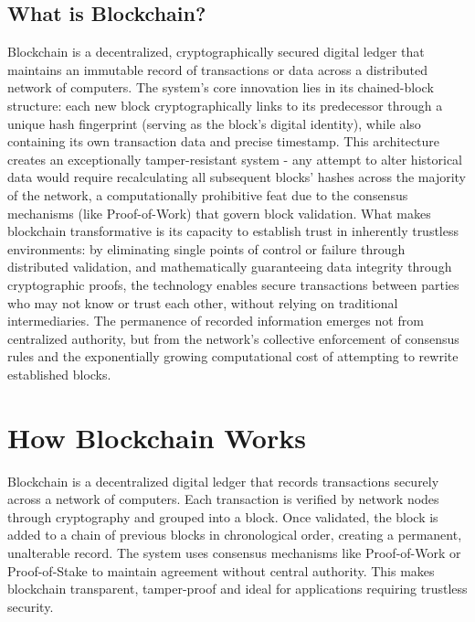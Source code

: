\documentclass[12pt, a4paper]{article}
\begin{document}
\subsection{What is Blockchain?}
Blockchain is a decentralized, cryptographically secured digital ledger that maintains an immutable record of transactions or data across a distributed network of computers. The system's core innovation lies in its chained-block structure: each new block cryptographically links to its predecessor through a unique hash fingerprint (serving as the block's digital identity), while also containing its own transaction data and precise timestamp. This architecture creates an exceptionally tamper-resistant system - any attempt to alter historical data would require recalculating all subsequent blocks' hashes across the majority of the network, a computationally prohibitive feat due to the consensus mechanisms (like Proof-of-Work) that govern block validation. What makes blockchain transformative is its capacity to establish trust in inherently trustless environments: by eliminating single points of control or failure through distributed validation, and mathematically guaranteeing data integrity through cryptographic proofs, the technology enables secure transactions between parties who may not know or trust each other, without relying on traditional intermediaries. The permanence of recorded information emerges not from centralized authority, but from the network's collective enforcement of consensus rules and the exponentially growing computational cost of attempting to rewrite established blocks.


\section{How Blockchain Works}
Blockchain is a decentralized digital ledger that records transactions securely across a network of computers. Each transaction is verified by network nodes through cryptography and grouped into a block. Once validated, the block is added to a chain of previous blocks in chronological order, creating a permanent, unalterable record. The system uses consensus mechanisms like Proof-of-Work or Proof-of-Stake to maintain agreement without central authority. This makes blockchain transparent, tamper-proof and ideal for applications requiring trustless security.
\end{document}
